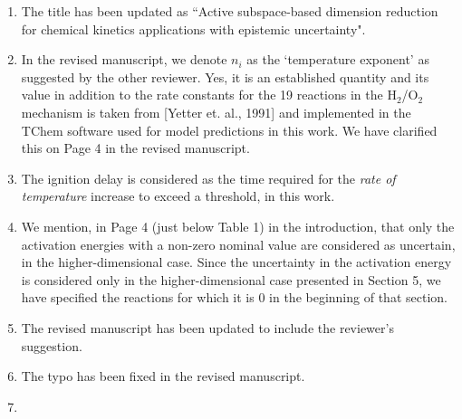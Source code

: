 \documentclass[11pt,final]{article}
\newcommand{\referee}[1]{\vspace{.1ex}\noindent{\textcolor{blue}{#1}}}
\begin{document}
\begin{enumerate}[wide, labelwidth=!, labelindent=0pt]
\item \referee{Why not use the word 'active' in the title, since active subspace is essentially
what has been done here?}

The title has been updated as ``Active subspace-based dimension
reduction for chemical kinetics applications with epistemic uncertainty".

\item \referee{3.36 $n_i$ is index or power? Is this an established term for
the power of T?  Also, what are the values of $n_i$'s?}

In the revised manuscript, we denote $n_i$ as the `temperature
exponent' as suggested by the other reviewer. Yes, it is an established
quantity and its value in addition to the rate constants for the 19 reactions
in the H$_2$/O$_2$ mechanism is taken from [Yetter et. al., 1991] and
implemented in the TChem software used for model predictions in this work. We
have clarified this on Page 4 in the revised manuscript. 

\item \referee{3.51 'rate of temperature' or 'temperature'?}

The ignition delay is considered as the time required for the {\it rate of temperature}
increase to exceed a threshold, in this work.

\item \referee{4.57 not clear where the number 33 comes from since we have 19
reactions. I see it is explained at the beginning of Section 5, but it should
be noted here briefly, too.}


We mention, in Page 4 (just below Table 1) in the introduction, that only the
activation energies with a non-zero nominal value are considered as uncertain,
in the higher-dimensional case.  Since the uncertainty in the activation energy
is considered only in the higher-dimensional case presented in Section 5, we
have specified the reactions for which it is 0 in the beginning of that
section.

\item \referee{6.19 distribution-$>$density function}

The revised manuscript has been updated to include the reviewer's suggestion. 

\item \referee{6.38: typo, $w_r$ should be $w_1$}

The typo has been fixed in the revised manuscript. 

\item \referee{7.23-27: why 'statistical independence' and not just 'independence'? Is there any other 
type of independence?}



\end{enumerate}
\end{document}
